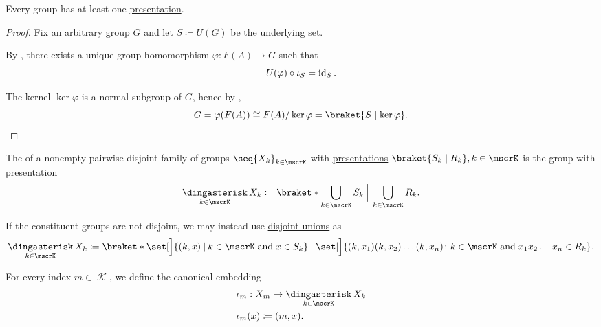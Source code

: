 \begin{proposition}\label{thm:every_group_is_presented}
  Every group has at least one \hyperref[def:group_presentation]{presentation}.
\end{proposition}
\begin{proof}
  Fix an arbitrary group \( G \) and let \( S \coloneqq U(G) \) be the underlying set.

  By , there exists a unique group homomorphism \( \varphi: F(A) \to G \) such that
  \begin{equation*}
    U(\varphi) \bincirc \iota_S = \id_S.
  \end{equation*}

  The kernel \( \ker \varphi \) is a normal subgroup of \( G \), hence by ,
  \begin{equation*}
    G = \varphi(F(A)) \cong F(A) / \ker \varphi = \braket{ S \mid \ker \varphi }.
  \end{equation*}
\end{proof}

\begin{definition}\label{def:group_free_product}
  The  of a nonempty pairwise disjoint family of groups \( \seq{ X_k }_{k \in \mscrK} \) with \hyperref[def:group_presentation]{presentations} \( \braket{S_k \mid R_k}, k \in \mscrK \) is the group with presentation
  \begin{equation*}
    \Ast_{k \in \mscrK} X_k \coloneqq \braket*{ \bigcup_{k \in \mscrK} S_k \given[\Big] \bigcup_{k \in \mscrK} R_k }.
  \end{equation*}

  If the constituent groups are not disjoint, we may instead use \hyperref[def:disjoint_union]{disjoint unions} as
  \small
  \begin{equation*}
    \Ast_{k \in \mscrK} X_k \coloneqq \braket*{ \set[\Big]{ (k, x) \given k \in \mscrK \T{and} x \in S_k } \given[\Big] \set[\Big]{ (k, x_1) (k, x_2) \ldots (k, x_n) \colon k \in \mscrK \T{and} x_1 x_2 \ldots x_n \in R_k } }.
  \end{equation*}
  \normalsize

  For every index \( m \in \mscrK \), we define the canonical embedding
  \begin{equation*}
    \begin{aligned}
       &\iota_m: X_m \to \Ast_{k \in \mscrK} X_k \\
       &\iota_m(x) \coloneqq (m, x).
    \end{aligned}
  \end{equation*}
\end{definition}

